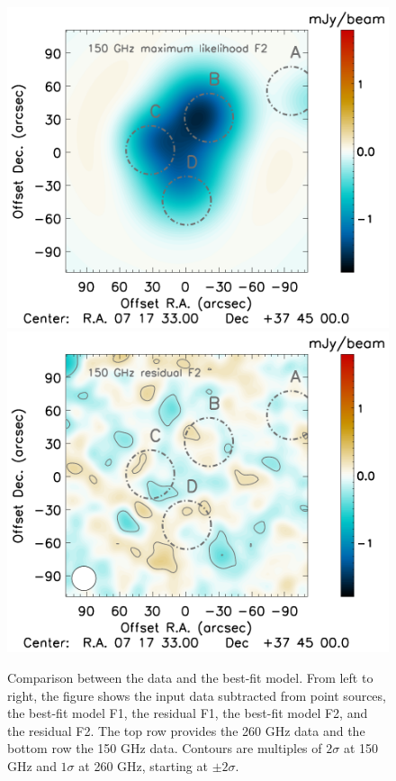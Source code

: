 \documentclass[twocolumn,traditabstract]{aa}
\begin{document}
\begin{figure}[h]
\includegraphics[trim=2.3cm 0.7cm 3.33cm 0cm, clip=true, totalheight=4cm]{Figure/MCMC_best_fit_2mm_ksz2_F2.pdf}
\includegraphics[trim=2.3cm 0.7cm 0cm 0cm, clip=true, totalheight=4cm]{Figure/MCMC_residual_2mm_ksz2_F2.pdf}
\caption{\footnotesize{Comparison between the data and the best-fit model. From left to right, the figure shows the input data subtracted from point sources, the best-fit model F1, the residual F1, the best-fit model F2, and the residual F2. The top row provides the 260 GHz data and the bottom row the 150 GHz data. Contours are multiples of $2 \sigma$ at 150 GHz and $1 \sigma$ at 260 GHz, starting at $\pm 2 \sigma$.}}
\label{fig:best_fit_maps}
\end{figure}
\end{document}
